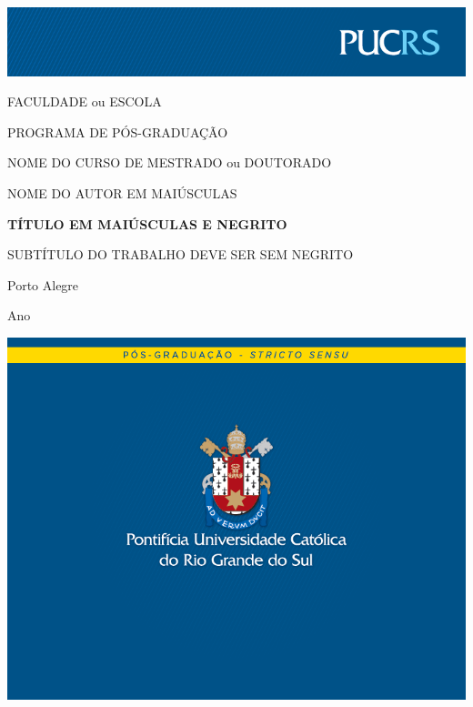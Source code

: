 \documentclass[a4paper]{article}
\def\changemargin#1#2{\list{}{\rightmargin#2\leftmargin#1}\item[]}
\begin{document}
\noindent\includegraphics[width=\textwidth]{fundomestradodoutorado_cima}

{ %

\changemargin{2cm}{2cm}

\begin{center}

\vfill

\large

FACULDADE ou ESCOLA

PROGRAMA DE PÓS-GRADUAÇÃO

NOME DO CURSO DE MESTRADO ou DOUTORADO

\vspace{10mm}

NOME DO AUTOR EM MAIÚSCULAS

\vspace{5mm}

\textbf{TÍTULO EM MAIÚSCULAS E NEGRITO}

\textrm{SUBTÍTULO DO TRABALHO DEVE SER SEM NEGRITO}

\vspace{5mm}

Porto Alegre

Ano

\end{center}

}

\vfill

\noindent\includegraphics[width=\textwidth]{fundomestradodoutorado_baixo}
\end{document}
